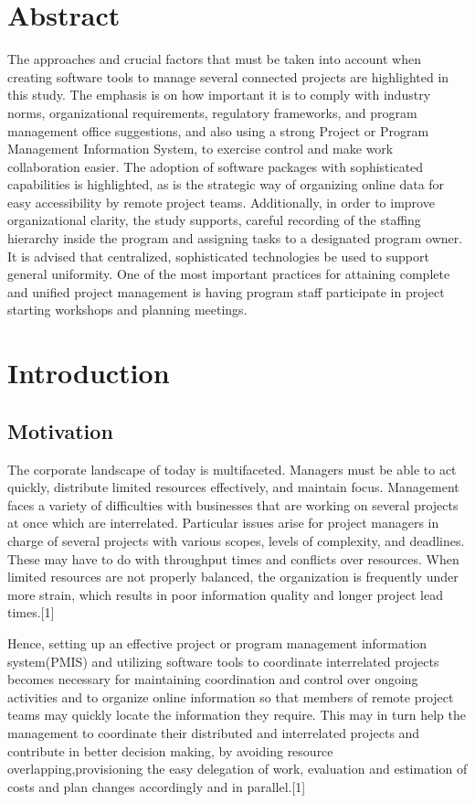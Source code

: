 \documentclass{llncs}
\begin{document}
\section{Abstract}
The approaches and crucial factors that must be taken into account when creating software tools to manage several connected projects are highlighted in this study. The emphasis is on how important it is to comply with industry norms, organizational requirements, regulatory frameworks, and program management office suggestions, and also using a strong Project or Program Management Information System, to exercise control and make work collaboration easier. The adoption of software packages with sophisticated capabilities is highlighted, as is the strategic way of organizing online data for easy accessibility by remote project teams. Additionally, in order to improve organizational clarity, the study supports, careful recording of the staffing hierarchy inside the program and assigning tasks to a designated program owner. It is advised that centralized, sophisticated technologies be used to support general uniformity. One of the most important practices for attaining complete and unified project management is having program staff participate in project starting workshops and planning meetings.


\tableofcontents

\newpage

\section{Introduction}

\subsection{Motivation}
The corporate landscape of today is multifaceted. Managers must be able to act quickly, distribute limited resources effectively, and maintain focus. Management faces a variety of difficulties with businesses that are working on several projects at once which are interrelated. Particular issues arise for project managers in charge of several projects with various scopes, levels of complexity, and deadlines. These may have to do with throughput times and conflicts over resources. When limited resources are not properly balanced, the organization is frequently under more strain, which results in poor information quality and longer project lead times.[1]

Hence, setting up an effective project or program management information system(PMIS) and utilizing software tools to coordinate interrelated projects becomes necessary for maintaining coordination and control over ongoing activities and to organize online information so that members of remote project teams may quickly locate the information they require. This may in turn help the management to coordinate their distributed and interrelated projects and contribute in better decision making, by avoiding resource overlapping,provisioning the easy delegation of work, evaluation and estimation of costs and plan changes accordingly and in parallel.[1]
\end{document}
